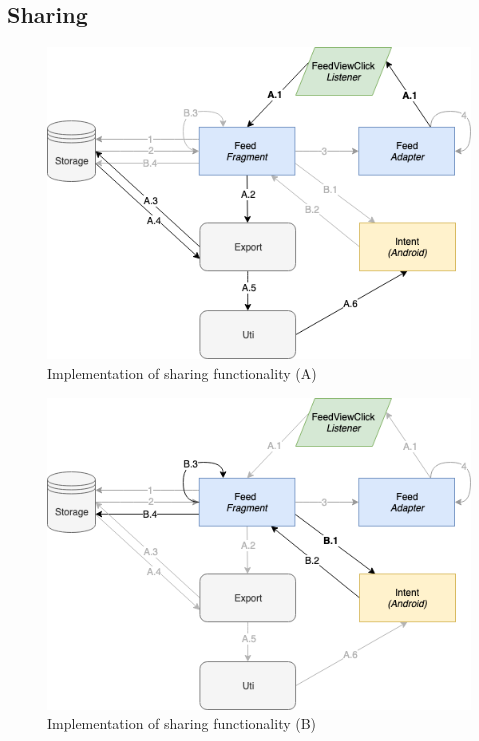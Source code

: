 \subsection{Sharing}
\begin{figure}
    \centering
    \includegraphics[scale=0.6]{images/Sharing_ImpA.png}
    \caption{Implementation of sharing functionality (A)}
    \label{fig:impl_sharingA}
\end{figure}

\begin{figure}
    \centering
    \includegraphics[scale=0.6]{images/Sharing_ImpB.png}
    \caption{Implementation of sharing functionality (B)}
    \label{fig:impl_sharingB}
\end{figure}


